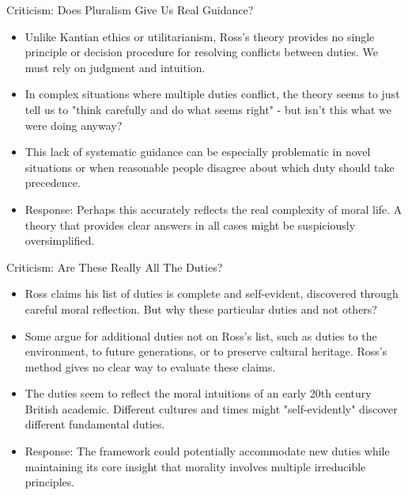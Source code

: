 \documentclass{beamer}
\begin{document}
\begin{frame}{Criticism: Does Pluralism Give Us Real Guidance?}
\begin{itemize}
    \item Unlike Kantian ethics or utilitarianism, Ross's theory provides no single principle or decision procedure for resolving conflicts between duties. We must rely on judgment and intuition.
    
    \item In complex situations where multiple duties conflict, the theory seems to just tell us to "think carefully and do what seems right" - but isn't this what we were doing anyway?
    
    \item This lack of systematic guidance can be especially problematic in novel situations or when reasonable people disagree about which duty should take precedence.
    
    \item Response: Perhaps this accurately reflects the real complexity of moral life. A theory that provides clear answers in all cases might be suspiciously oversimplified.
\end{itemize}
\end{frame}

\begin{frame}{Criticism: Are These Really All The Duties?}
\begin{itemize}
    \item Ross claims his list of duties is complete and self-evident, discovered through careful moral reflection. But why these particular duties and not others?
    
    \item Some argue for additional duties not on Ross's list, such as duties to the environment, to future generations, or to preserve cultural heritage. Ross's method gives no clear way to evaluate these claims.
    
    \item The duties seem to reflect the moral intuitions of an early 20th century British academic. Different cultures and times might "self-evidently" discover different fundamental duties.
    
    \item Response: The framework could potentially accommodate new duties while maintaining its core insight that morality involves multiple irreducible principles.
\end{itemize}
\end{frame}
\end{document}
